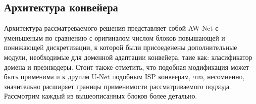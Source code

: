 \subsection{Архитектура конвейера}\label{sect-4-1}

Архитектура рассматреваемого решения представляет собой AW-Net с уменьшеным по сравнению с оригиналом числом блоков повышающей и понижающей дискретизации, к которой были присоеденены дополнительные модули, необходимые для доменной адаптации конвейера, таие как: класификатор домена и преэнкодеры. Стоит также отметить, что подобная модификация может быть применима и к другим U-Net подобным ISP конвеерам, что, несомненно, значительно расширяет границы применимости рассматриваемого подхода. Рассмотрим каждый из вышеописанных блоков более детально.

